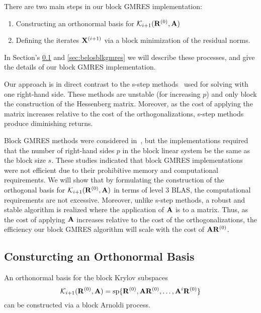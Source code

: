 \documentclass[twoside]{siamltex}
\newcommand{\bA}{{\bf A}}
\newcommand{\bR}{{\bf R}}
\newcommand{\bX}{{\bf X}}
\newcommand{\dm}{\begin{displaymath}}
\newcommand{\edm}{\end{displaymath}}
\begin{document}
There are two main steps in our block GMRES implementation:
\begin{enumerate}
\item Constructing an orthonormal basis for ${\cal
K}_{i+1}(\bR^{(0)}, \bA)$
\item Defining the iterates $\bX^{(i+1)}$ via a block minimization
of the residual norms.
\end{enumerate}
In Section's \ref{sec:blkarn} and \ref{sec:belosblkgmres} we will
describe these processes, and give the details of our block GMRES
implementation.

Our approach is in direct contrast to the s-step
methods~\cite{chro:91,chki:92,li:97} used for solving with one
right-hand side. These methods are unstable (for increasing $p$)
and only block the construction of the Hessenberg matrix.
Moreover, as the cost of applying the matrix increases relative to
the cost of the orthogonalizations, s-step methods produce
diminishing returns.

Block GMRES methods were considered in~\cite{siga:95,siga:96}, but
the implementations required that the number of right-hand sides
$p$ in the block linear system be the same as the block size $s$.
These studies indicated that block GMRES implementations were not
efficient due to their prohibitive memory and computational
requirements. We will show that by formulating the construction of
the orthogonal basis for ${\cal K}_{i+1}(\bR^{(0)}, \bA)$ in terms
of level 3 BLAS, the computational requirements are not excessive.
Moreover, unlike s-step methods, a robust and stable algorithm is
realized where the application of $\bA$ is to a matrix. Thus, as
the cost of applying $\bA$ increases relative to the cost of the
orthogonalizations, the efficiency our block GMRES algorithm will
scale with the cost of $\bA \bR^{(0)}$.


\subsection{Consturcting an Orthonormal Basis} \label{sec:blkarn}

An orthonormal basis for the block Krylov subspaces
 \dm
 {\cal K}_{i+1}(\bR^{(0)}, \bA) = {\rm sp} \{ \bR^{(0)}, \bA
 \bR^{(0)}, \ldots, \bA^i \bR^{(0)} \}
 \edm
can be constructed via a block Arnoldi process.
\end{document}
